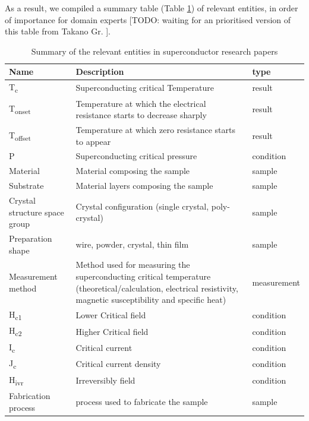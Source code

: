\documentclass[a4paper,10pt]{article}
\begin{document}
As a result, we compiled a summary table (Table \ref{table:summary-entities-superconductor}) of relevant entities, in order of importance for domain experts [TODO: waiting for an prioritised version of this table from Takano Gr. ].

\begin{table}[h!]
    \centering
    \begin{tabular}{ | m{5em} | m{8cm}| m{5em} | } 
    \hline
        Name & Description & type \\ [0.5ex] 
    \hline\hline
        T\textsubscript{c} & Superconducting critical Temperature & result\\ 
    \hline
        T\textsubscript{onset} & Temperature at which the electrical resistance starts to decrease sharply & result\\
    \hline 
        T\textsubscript{offset} & Temperature at which zero resistance starts to appear & result\\ 
    \hline
        P & Superconducting critical pressure & condition\\
    \hline
        Material & Material composing the sample & sample \\
    \hline  
        Substrate & Material layers composing the sample & sample\\
    \hline
        Crystal structure space group & Crystal configuration (single crystal, poly-crystal) & sample \\
    \hline 
        Preparation shape & wire, powder, crystal, thin film & sample\\
    \hline 
        Measurement method & Method used for measuring the superconducting critical temperature (theoretical/calculation, electrical resistivity, magnetic susceptibility and specific heat) & measurement\\
    \hline
        H\textsubscript{c1} & Lower Critical field & condition\\ 
    \hline
        H\textsubscript{c2} & Higher Critical field & condition\\ 
    \hline
        I\textsubscript{c} & Critical current & condition\\
    \hline
        J\textsubscript{c} & Critical current density & condition\\ 
    \hline
        H\textsubscript{ivr} & Irreversibly field & condition\\
    \hline    
        Fabrication process & process used to fabricate the sample & sample\\
    \hline    
    \end{tabular}
    \caption{Summary of the relevant entities in superconductor research papers}
    \label{table:summary-entities-superconductor}
\end{table}
\end{document}
